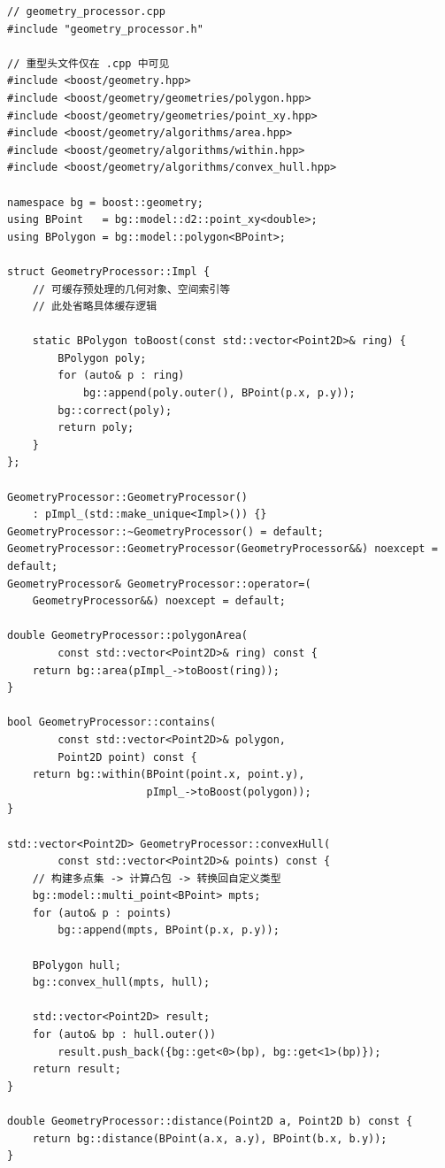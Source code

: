 \documentclass[12pt,a4paper,fontset=fandol]{ctexbook}
\begin{document}
\begin{lstlisting}[caption={几何处理器——实现文件隔离 Boost}]
// geometry_processor.cpp
#include "geometry_processor.h"

// 重型头文件仅在 .cpp 中可见
#include <boost/geometry.hpp>
#include <boost/geometry/geometries/polygon.hpp>
#include <boost/geometry/geometries/point_xy.hpp>
#include <boost/geometry/algorithms/area.hpp>
#include <boost/geometry/algorithms/within.hpp>
#include <boost/geometry/algorithms/convex_hull.hpp>

namespace bg = boost::geometry;
using BPoint   = bg::model::d2::point_xy<double>;
using BPolygon = bg::model::polygon<BPoint>;

struct GeometryProcessor::Impl {
    // 可缓存预处理的几何对象、空间索引等
    // 此处省略具体缓存逻辑

    static BPolygon toBoost(const std::vector<Point2D>& ring) {
        BPolygon poly;
        for (auto& p : ring)
            bg::append(poly.outer(), BPoint(p.x, p.y));
        bg::correct(poly);
        return poly;
    }
};

GeometryProcessor::GeometryProcessor()
    : pImpl_(std::make_unique<Impl>()) {}
GeometryProcessor::~GeometryProcessor() = default;
GeometryProcessor::GeometryProcessor(GeometryProcessor&&) noexcept = default;
GeometryProcessor& GeometryProcessor::operator=(
    GeometryProcessor&&) noexcept = default;

double GeometryProcessor::polygonArea(
        const std::vector<Point2D>& ring) const {
    return bg::area(pImpl_->toBoost(ring));
}

bool GeometryProcessor::contains(
        const std::vector<Point2D>& polygon,
        Point2D point) const {
    return bg::within(BPoint(point.x, point.y),
                      pImpl_->toBoost(polygon));
}

std::vector<Point2D> GeometryProcessor::convexHull(
        const std::vector<Point2D>& points) const {
    // 构建多点集 -> 计算凸包 -> 转换回自定义类型
    bg::model::multi_point<BPoint> mpts;
    for (auto& p : points)
        bg::append(mpts, BPoint(p.x, p.y));

    BPolygon hull;
    bg::convex_hull(mpts, hull);

    std::vector<Point2D> result;
    for (auto& bp : hull.outer())
        result.push_back({bg::get<0>(bp), bg::get<1>(bp)});
    return result;
}

double GeometryProcessor::distance(Point2D a, Point2D b) const {
    return bg::distance(BPoint(a.x, a.y), BPoint(b.x, b.y));
}
\end{lstlisting}
\end{document}
